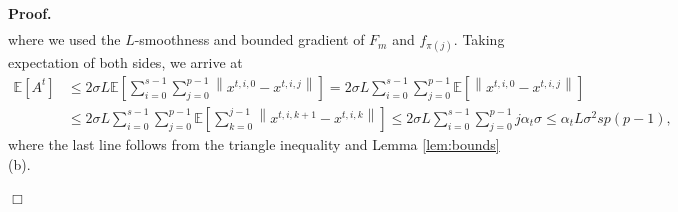 \documentclass[11pt,a4paper]{article}
\numberwithin{equation}{section}%
\newenvironment{proof}[1][Proof]{\noindent \textbf{#1.} }{\hfill$\Box$\par\medskip}
\renewcommand{\(}{\left (}
\renewcommand{\)}{\right )}
\newcommand{\Lphif}{L}
\newcommand{\Fm}{F_m}
\begin{document}
\begin{proof}
\begin{align*}
\end{align*}
where we used the $\Lphif$-smoothness and bounded gradient of $\Fm$ and $f_{\pi(j)}$.
Taking expectation of both sides, we arrive at
\begin{align*}
    \mathbb{E}[A^t] &
    \leq 2\sigma \Lphif  \mathbb{E} \left[ \sum_{i=0}^{s-1} \sum_{j=0}^{p-1}  \left  \|x^{t,i,0}-x^{t,i,j}\right\|\right]= 2\sigma \Lphif   \sum_{i=0}^{s-1} \sum_{j=0}^{p-1}  \mathbb{E} \left[\left  \|x^{t,i,0}-x^{t,i,j}\right\|\right] \\
    &\leq 2\sigma \Lphif   \sum_{i=0}^{s-1} \sum_{j=0}^{p-1}  \mathbb{E} \left[\sum_{k=0}^{j-1} \left  \|x^{t,i,k+1}-x^{t,i,k}\right\|\right] \leq  2\sigma \Lphif  \sum_{i=0}^{s-1}  \sum_{j=0}^{p-1} j\alpha_t\sigma \leq  \alpha_t \Lphif \sigma^2 s p(p-1),
\end{align*}
where the last line follows from the triangle inequality and Lemma \ref{lem:bounds}(b).


\end{proof}
\end{document}
